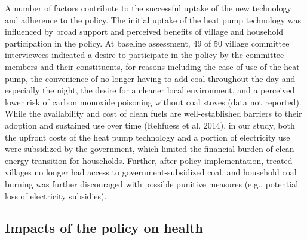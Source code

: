 \documentclass[
  letterpaper,
  DIV=11,
  numbers=noendperiod]{scrartcl}
\begin{document}
A number of factors contribute to the successful uptake of the new
technology and adherence to the policy. The initial uptake of the heat
pump technology was influenced by broad support and perceived benefits
of village and household participation in the policy. At baseline
assessment, 49 of 50 village committee interviewees indicated a desire
to participate in the policy by the committee members and their
constituents, for reasons including the ease of use of the heat pump,
the convenience of no longer having to add coal throughout the day and
especially the night, the desire for a cleaner local environment, and a
perceived lower risk of carbon monoxide poisoning without coal stoves
(data not reported). While the availability and cost of clean fuels are
well-established barriers to their adoption and sustained use over time
(Rehfuess et al. 2014), in our study, both the upfront costs of the heat
pump technology and a portion of electricity use were subsidized by the
government, which limited the financial burden of clean energy
transition for households. Further, after policy implementation, treated
villages no longer had access to government-subsidized coal, and
household coal burning was further discouraged with possible punitive
measures (e.g., potential loss of electricity subsidies).

\subsection{Impacts of the policy on
health}\label{impacts-of-the-policy-on-health}
\end{document}
